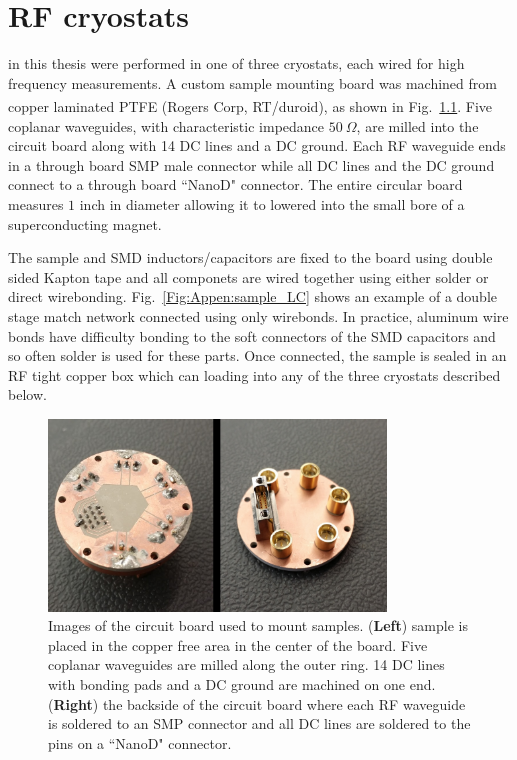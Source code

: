 \chapter{RF cryostats}
\label{appen:RF_cryostats}
 in this thesis were performed in one of three cryostats, each wired for high frequency measurements. A custom sample mounting board was machined from copper laminated PTFE (Rogers Corp, RT/duroid\textsuperscript{\textregistered}), as shown in Fig.~\ref{Fig:Appen:sample_board}. Five coplanar waveguides, with characteristic impedance $50~\Omega$, are milled into the circuit board along with 14 DC lines and a DC ground. Each RF waveguide ends in a through board SMP male connector while all DC lines and the DC ground connect to a through board ``NanoD" connector. The entire circular board measures $1$ inch in diameter allowing it to lowered into the small bore of a superconducting magnet. 

The sample and SMD inductors/capacitors are fixed to the board using double sided Kapton tape and all componets are wired together using either solder or direct wirebonding. Fig.~\ref{Fig:Appen:sample_LC} shows an example of a double stage match network connected using only wirebonds. In practice, aluminum wire bonds have difficulty bonding to the soft connectors of the SMD capacitors and so often solder is used for these parts. Once connected, the sample is sealed in an RF tight copper box which can loading into any of the three cryostats described below.

\begin{figure}
\centering
\includegraphics[width=0.8\textwidth]{figures/appendix/cryostats/sample_package.jpg}
\caption{Images of the circuit board used to mount samples. (\textbf{Left}) sample is placed in the copper free area in the center of the board. Five coplanar waveguides are milled along the outer ring. 14 DC lines with bonding pads and a DC ground are machined on one end. (\textbf{Right}) the backside of the circuit board where each RF waveguide is soldered to an SMP connector and all DC lines are soldered to the pins on a ``NanoD" connector.}
\label{Fig:Appen:sample_board}
\end{figure}

